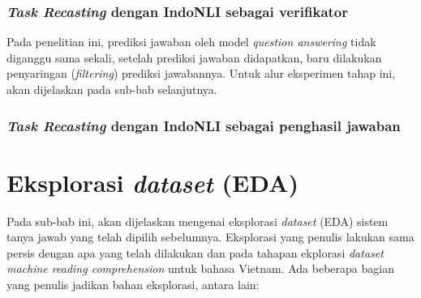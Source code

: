\subsubsection{\emph{Task Recasting} dengan IndoNLI sebagai verifikator}
Pada penelitian ini, prediksi jawaban oleh model \emph{question answering} tidak diganggu sama sekali, setelah prediksi jawaban didapatkan, baru dilakukan penyaringan (\emph{filtering}) prediksi jawabannya. Untuk alur eksperimen tahap ini, akan dijelaskan pada sub-bab selanjutnya. 

\subsubsection{\emph{Task Recasting} dengan IndoNLI sebagai penghasil jawaban}
\todo

\section{Eksplorasi \emph{dataset} (EDA)}
Pada sub-bab ini, akan dijelaskan mengenai eksplorasi \emph{dataset} (EDA) sistem tanya jawab yang telah dipilih sebelumnya. Eksplorasi yang penulis lakukan sama persis dengan apa yang telah dilakukan \citet{nguyen-etal-2020-vietnamese} dan \citet{rajpurkar-etal-2016-squad} pada tahapan ekplorasi \emph{dataset machine reading comprehension} untuk bahasa Vietnam. Ada beberapa bagian yang penulis jadikan bahan eksplorasi, antara lain:

